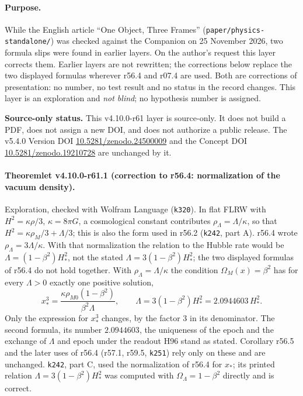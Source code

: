 \paragraph{Purpose.}
While the English article ``One Object, Three Frames'' (\texttt{paper/\allowbreak physics-standalone/}) was checked against the Companion on
25 November 2026, two formula slips were found in earlier layers.  On the author's request this layer corrects them.  Earlier layers are not
rewritten; the corrections below replace the two displayed formulas wherever r56.4 and r07.4 are used.  Both are corrections of
presentation: no number, no test result and no status in the record changes.  This layer is an exploration and \emph{not blind}; no hypothesis
number is assigned.

\noindent\textbf{Source-only status.}
This v4.10.0-r61 layer is source-only.  It does not build a PDF, does not assign a new DOI,
and does not authorize a public release.  The v5.4.0 Version DOI
\href{https://doi.org/10.5281/zenodo.24500009}{10.5281/zenodo.24500009} and the Concept DOI
\href{https://doi.org/10.5281/zenodo.19210728}{10.5281/zenodo.19210728} are unchanged by it.

\paragraph{Theoremlet v4.10.0-r61.1 (correction to r56.4: normalization of the vacuum density).}
Exploration, checked with Wolfram Language (\texttt{k320}).  In flat FLRW with \(H^2=\kappa\rho/3\), \(\kappa=8\pi G\), a cosmological constant
contributes \(\rho_\Lambda=\Lambda/\kappa\), so that \(H^2=\kappa\rho_M/3+\Lambda/3\); this is also the form used in r56.2 (\texttt{k242}, part A).
r56.4 wrote \(\rho_\Lambda=3\Lambda/\kappa\).  With that normalization the relation to the Hubble rate would be \(\Lambda=(1-\beta^2)H_*^2\), not the
stated \(\Lambda=3(1-\beta^2)H_*^2\); the two displayed formulas of r56.4 do not hold together.  With \(\rho_\Lambda=\Lambda/\kappa\) the condition
\(\Omega_M(x)=\beta^2\) has for every \(\Lambda>0\) exactly one positive solution,
\[
x_*^3=\frac{\kappa\rho_{M0}(1-\beta^2)}{\beta^2\Lambda},\qquad \Lambda=3(1-\beta^2)H_*^2=2.0944603\,H_*^2 .
\]
Only the expression for \(x_*^3\) changes, by the factor 3 in its denominator.  The second formula, its number \(2.0944603\), the uniqueness of the
epoch and the exchange of \(\Lambda\) and epoch under the readout H96 stand as stated.  Corollary r56.5 and the later uses of r56.4 (r57.1, r59.5,
\texttt{k251}) rely only on these and are unchanged.  \texttt{k242}, part C, used the normalization of r56.4 for \(x_*\); its printed relation
\(\Lambda=3(1-\beta^2)H_*^2\) was computed with \(\Omega_\Lambda=1-\beta^2\) directly and is correct.

